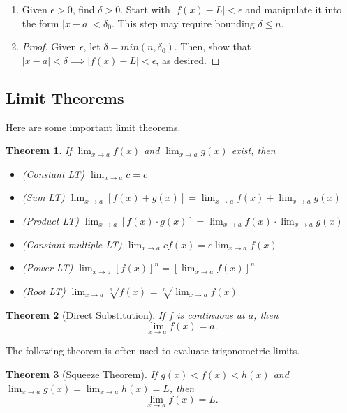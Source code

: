 \documentclass[11pt]{scrartcl}
\theoremstyle{plain}
\newtheorem{theorem}{Theorem}[section]
\theoremstyle{definition}
\theoremstyle{remark}
\begin{document}
\begin{enumerate}
    \item Given $\epsilon>0$, find $\delta>0$. Start with $\lvert f(x)-L \rvert<\epsilon$ and manipulate
    it into the form $\lvert x-a \rvert<\delta_{0}$. This step may require bounding $\delta\leq n$.
    \item \begin{proof} 
        Given $\epsilon$, let $\delta=min(n,\delta_{0})$. Then, show that $\lvert x-a 
        \rvert<\delta\implies \lvert f(x)-L \rvert<\epsilon$, as desired. 
    \end{proof}
\end{enumerate}

\subsection{Limit Theorems}

Here are some important limit theorems.

\begin{theorem}
    If $\lim_{ x \to a }f(x)$ and $\lim_{ x \to a }g(x)$ exist, then
    \begin{itemize}
        \item (Constant LT) $\lim_{ x \to a }c=c$
        \item (Sum LT) $\lim_{ x \to a }[f(x)+g(x)]=\lim_{ x \to a }f(x)+\lim_{ x \to a }g(x)$
        \item (Product LT) $\lim_{ x \to a }[f(x)\cdot g(x)]=\lim_{ x \to a }f(x)\cdot 
        \lim_{ x \to a }g(x)$
        \item (Constant multiple LT) $\lim_{ x \to a }cf(x)=c\lim_{ x \to a }f(x)$
        \item (Power LT) $\lim_{ x \to a }[f(x)]^n=[\lim_{ x \to a }f(x)]^n$
        \item (Root LT) $\lim_{ x \to a }\sqrt[n]{ f(x) }=\sqrt[n]{ \lim_{ x \to a }f(x) }$
    \end{itemize}
\end{theorem}

\begin{theorem}[Direct Substitution]
    If $f$ is continuous at $a$, then \[ \lim_{ x \to a } f(x)=a. \]
\end{theorem}

The following theorem is often used to evaluate trigonometric limits.

\begin{theorem}[Squeeze Theorem]
    If $g(x)<f(x)<h(x)$ and $\lim_{ x \to a }g(x)=\lim_{ x \to a }h(x)=L$, then 
    \[ \lim_{ x \to a } f(x)=L. \]
\end{theorem}
\end{document}
